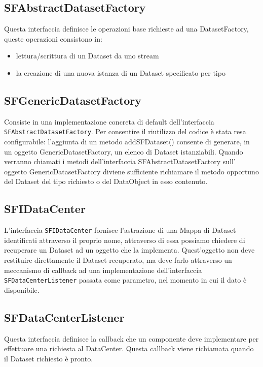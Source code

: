 \subsection{SFAbstractDatasetFactory}
\label{sub:sfabstractdatasetfactory}
Questa interfaccia definisce le operazioni base richieste ad una DatasetFactory, queste operazioni consistono in:
\begin{itemize}
	\item lettura/scrittura di un Dataset da uno stream
	\item la creazione di una nuova istanza di un Dataset specificato per tipo
\end{itemize}

\subsection{SFGenericDatasetFactory}
\label{sub:sfgenericdatasetfactory}
Consiste in una implementazione concreta di default dell'interfaccia \texttt{SFAbstractDatasetFactory}.
Per consentire il riutilizzo del codice è stata resa configurabile: l'aggiunta di un metodo addSFDataset() consente di generare, in un oggetto GenericDatasetFactory, un elenco di Dataset istanziabili.
Quando verranno chiamati i metodi dell'interfaccia SFAbstractDatasetFactory sull' oggetto GenericDatasetFactory diviene sufficiente richiamare il metodo opportuno del Dataset del tipo richiesto o del DataObject in esso contenuto.

\subsection{SFIDataCenter}
\label{sub:sfidatacenter}
L'interfaccia \texttt{SFIDataCenter} fornisce l'astrazione di una Mappa di Dataset identificati attraverso il proprio nome, attraverso di essa possiamo chiedere di recuperare un Dataset ad un oggetto che la implementa.
Quest'oggetto non deve restituire direttamente il Dataset recuperato, ma deve farlo attraverso un meccanismo di callback ad una implementazione dell'interfaccia \texttt{SFDataCenterListener} passata come parametro, nel momento in cui il dato è disponibile.

\subsection{SFDataCenterListener}
\label{sub:sfdatacenterlistener}
Questa interfaccia definisce la callback che un componente deve implementare per effettuare una richiesta al DataCenter.
Questa callback viene richiamata quando il Dataset richiesto è pronto.

